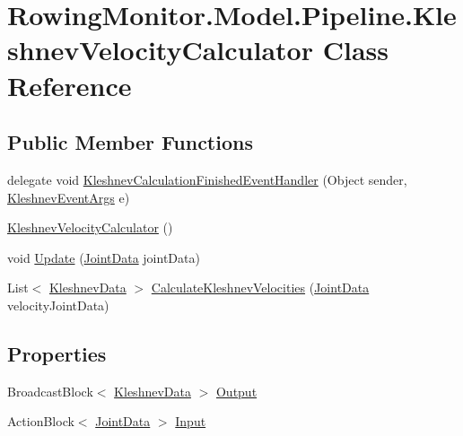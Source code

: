 \hypertarget{class_rowing_monitor_1_1_model_1_1_pipeline_1_1_kleshnev_velocity_calculator}{}\section{Rowing\+Monitor.\+Model.\+Pipeline.\+Kleshnev\+Velocity\+Calculator Class Reference}
\label{class_rowing_monitor_1_1_model_1_1_pipeline_1_1_kleshnev_velocity_calculator}
\subsection*{Public Member Functions}
\begin{DoxyCompactItemize}
\item 
delegate void \hyperlink{class_rowing_monitor_1_1_model_1_1_pipeline_1_1_kleshnev_velocity_calculator_aa8c251dc416d32f364bf138f4abeada7}{Kleshnev\+Calculation\+Finished\+Event\+Handler} (Object sender, \hyperlink{class_rowing_monitor_1_1_model_1_1_kleshnev_event_args}{Kleshnev\+Event\+Args} e)
\item 
\hyperlink{class_rowing_monitor_1_1_model_1_1_pipeline_1_1_kleshnev_velocity_calculator_ae642d137281c0ce38a84300066b28a64}{Kleshnev\+Velocity\+Calculator} ()
\item 
void \hyperlink{class_rowing_monitor_1_1_model_1_1_pipeline_1_1_kleshnev_velocity_calculator_af2ff2cb627827d1167732566636cc593}{Update} (\hyperlink{struct_rowing_monitor_1_1_model_1_1_util_1_1_joint_data}{Joint\+Data} joint\+Data)
\item 
List$<$ \hyperlink{struct_rowing_monitor_1_1_model_1_1_pipeline_1_1_kleshnev_data}{Kleshnev\+Data} $>$ \hyperlink{class_rowing_monitor_1_1_model_1_1_pipeline_1_1_kleshnev_velocity_calculator_a24776dfe3d1a8d3a499bfa48e721a868}{Calculate\+Kleshnev\+Velocities} (\hyperlink{struct_rowing_monitor_1_1_model_1_1_util_1_1_joint_data}{Joint\+Data} velocity\+Joint\+Data)
\end{DoxyCompactItemize}
\subsection*{Properties}
\begin{DoxyCompactItemize}
\item 
Broadcast\+Block$<$ \hyperlink{struct_rowing_monitor_1_1_model_1_1_pipeline_1_1_kleshnev_data}{Kleshnev\+Data} $>$ \hyperlink{class_rowing_monitor_1_1_model_1_1_pipeline_1_1_kleshnev_velocity_calculator_aed5495aa6d896a442ce39926ee30ed2c}{Output}
\item 
Action\+Block$<$ \hyperlink{struct_rowing_monitor_1_1_model_1_1_util_1_1_joint_data}{Joint\+Data} $>$ \hyperlink{class_rowing_monitor_1_1_model_1_1_pipeline_1_1_kleshnev_velocity_calculator_a87c25ad950ba36047df4367a3a90cd20}{Input}
\end{DoxyCompactItemize}
